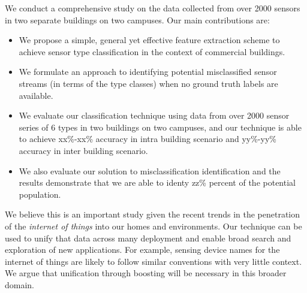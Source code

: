 We conduct a comprehensive study on the data collected from over 2000 sensors in two separate buildings on two campuses. Our main contributions are:

\begin{itemize}
\item We propose a simple, general yet effective feature extraction scheme to achieve sensor type classification in the context of commercial buildings.
\item We formulate an approach to identifying potential misclassified sensor streams (in terms of the type classes) when no ground truth labels are available.
\item We evaluate our classification technique using data from over 2000 sensor series of 6 types in two buildings on two campuses, and our technique is able to achieve xx\%-xx\% accuracy in intra building scenario and yy\%-yy\% accuracy in inter building scenario.
\item We also evaluate our solution to misclassification identification and the results demonstrate that we are able to identy zz\% percent of the potential population.
\end{itemize}


We believe this is an important study given the recent trends in the penetration
of the \emph{internet of things} into our homes and environments.
Our technique can be used to unify that data across many deployment and enable broad search 
and exploration of new applications.  For example, sensing device names for 
the internet of things are likely to follow similar conventions with very little 
context.  We argue that unification through boosting will be necessary in this broader domain.




 







